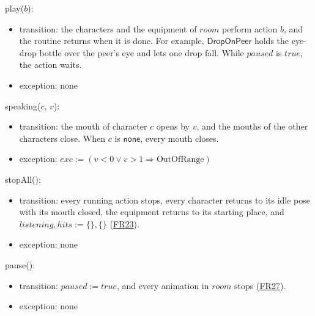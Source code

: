 \documentclass[10pt, titlepage]{article}
\newcommand{\srsurl}{https://team-hindsight.github.io/ophthamology-game/SRS/SRS.pdf}
\newcommand{\srsitemref}[2]{\href{\srsurl\#nameddest=#1}{#2}}
\newcommand{\T}[1]{\mathit{#1}}          %
\newcommand{\V}[1]{\mathsf{#1}}          %
\newcommand{\exc}{\mathit{exc}}
\newcommand{\true}{\mathit{true}}
\begin{document}
\begin{samepage}
\noindent play($b$):
\begin{itemize}
\item transition: the characters and the equipment of $\T{room}$ perform
  action $b$, and the routine returns when it is done. For example,
  $\V{DropOnPeer}$ holds the eye-drop bottle over the peer's eye and lets one
  drop fall. While $\T{paused}$ is $\true$, the action waits.
\item exception: none
\end{itemize}
\end{samepage}
\par\pagebreak[0]

\begin{samepage}
\noindent speaking($c$, $v$):
\begin{itemize}
\item transition: the mouth of character $c$ opens by $v$, and the mouths of
  the other characters close. When $c$ is $\V{none}$, every mouth closes.
\item exception: $\exc := (v < 0 \vee v > 1 \Rightarrow \text{OutOfRange})$
\end{itemize}
\end{samepage}
\par\pagebreak[0]

\begin{samepage}
\noindent stopAll():
\begin{itemize}
\item transition: every running action stops, every character returns to its
  idle pose with its mouth closed, the equipment returns to its starting
  place, and $\T{listening}, \T{hits} := \{\}, \{\}$
  (\srsitemref{FR_StopOnExit}{FR23}).
\item exception: none
\end{itemize}
\end{samepage}
\par\pagebreak[0]

\begin{samepage}
\noindent pause():
\begin{itemize}
\item transition: $\T{paused} := \true$, and every animation in $\T{room}$
  stops (\srsitemref{FR_Suspend}{FR27}).
\item exception: none
\end{itemize}
\end{samepage}
\par\pagebreak[0]
\end{document}
